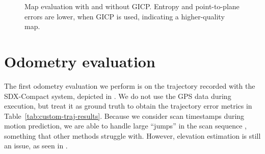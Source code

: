 \begin{figure}[H]
    \centering
    \hspace{1pt}
    \caption[Map evaluation with and without GICP]{Map evaluation with and without GICP. Entropy and point-to-plane errors are lower, when GICP is used, indicating a higher-quality map.}
    \label{fig:gicp-map-result}
\end{figure}


\section{Odometry evaluation}

The first odometry evaluation we perform is on the trajectory recorded with the \mbox{SDX-Compact} system, depicted in . We do not use the GPS data during execution, but treat it as ground truth to obtain the trajectory error metrics in Table~\ref{tab:custom-traj-results}. Because we consider scan timestamps during motion prediction, we are able to handle large ``jumps'' in the scan sequence , something that other methods struggle with. However, elevation estimation is still an issue, as seen in .

